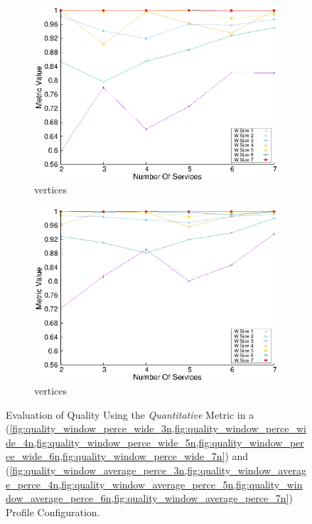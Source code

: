 \begin{figure}[H]
\begin{subfigure}{0.45\textwidth}
    \includegraphics[width=\textwidth]{Images/graphs/window_quality_performance_diff_perce_n7_s7_20_100_n7}
    \caption{ vertices}
    \label{fig:quality_window_perce_wide_7n}
  \end{subfigure}
  \hfill
  \begin{subfigure}{0.45\textwidth}
    \includegraphics[width=\textwidth]{Images/graphs/window_quality_performance_diff_perce_n7_s7_50_89_n7}
    \caption{ vertices}
    \label{fig:quality_window_average_perce_7n}
  \end{subfigure}
  \caption{Evaluation of Quality Using the \emph{Quantitative} Metric in a \wide (\cref{fig:quality_window_perce_wide_3n,fig:quality_window_perce_wide_4n,fig:quality_window_perce_wide_5n,fig:quality_window_perce_wide_6n,fig:quality_window_perce_wide_7n}) and \average (\cref{fig:quality_window_average_perce_3n,fig:quality_window_average_perce_4n,fig:quality_window_average_perce_5n,fig:quality_window_average_perce_6n,fig:quality_window_average_perce_7n}) Profile Configuration.}  \label{fig:quality_window_perce}
\end{figure}


